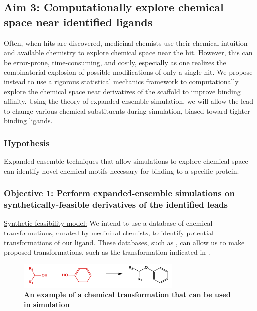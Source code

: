 \documentclass[12pt]{article}
\begin{document}
\subsection*{Aim 3: Computationally explore chemical space near identified ligands}
Often, when hits are discovered, medicinal chemists use their chemical intuition and available chemistry to explore chemical space near the hit. However, this can be error-prone, time-consuming, and costly, especially as one realizes the combinatorial explosion of possible modifications of only a single hit. We propose instead to use a rigorous statistical mechanics framework to computationally explore the chemical space near derivatives of the scaffold to improve binding affinity. Using the theory of expanded ensemble simulation\cite{lyubartsev1992}, we will allow the lead to change various chemical substituents during simulation, biased toward tighter-binding ligands. 


\subsubsection*{Hypothesis}
Expanded-ensemble techniques that allow simulations to explore chemical space can identify novel chemical motifs necessary for binding to a specific protein.

\subsubsection*{Objective 1: Perform expanded-ensemble simulations on synthetically-feasible derivatives of the identified leads}

\underline{Synthetic feasibility model:} We intend to use a database of chemical transformations, curated by medicinal chemists, to identify potential transformations of our ligand. These databases, such as \cite{chemtransform}, can allow us to make proposed transformations, such as the transformation indicated in .

\begin{figure}[H]
\centering
 \includegraphics[width=0.7\textwidth]{chem_trans.png}
 \caption{\textbf{An example of a chemical transformation that can be used in simulation} \cite{chemtransform}}
 \label{transfig}
 \end{figure}
\end{document}
